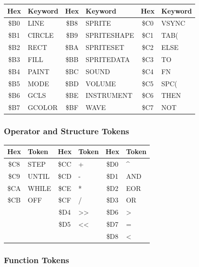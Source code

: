 \begin{center}
\begin{longtable}{cl|cl|cl}
\toprule
\textbf{Hex} & \textbf{Keyword} &
\textbf{Hex} & \textbf{Keyword} &
\textbf{Hex} & \textbf{Keyword} \\
\midrule
\endhead
\$B0 & LINE        & \$B8 & SPRITE      & \$C0 & VSYNC    \\
\$B1 & CIRCLE      & \$B9 & SPRITESHAPE & \$C1 & TAB(     \\
\$B2 & RECT        & \$BA & SPRITESET   & \$C2 & ELSE     \\
\$B3 & FILL        & \$BB & SPRITEDATA  & \$C3 & TO       \\
\$B4 & PAINT       & \$BC & SOUND       & \$C4 & FN       \\
\$B5 & MODE        & \$BD & VOLUME      & \$C5 & SPC(     \\
\$B6 & GCLS        & \$BE & INSTRUMENT  & \$C6 & THEN     \\
\$B7 & GCOLOR      & \$BF & WAVE        & \$C7 & NOT      \\
\bottomrule
\end{longtable}
\end{center}

\subsubsection*{Operator and Structure Tokens}

\begin{center}
\begin{tabular}{cl|cl|cl}
\toprule
\textbf{Hex} & \textbf{Token} &
\textbf{Hex} & \textbf{Token} &
\textbf{Hex} & \textbf{Token} \\
\midrule
\$C8 & STEP     & \$CC & +     & \$D0 & \^{}     \\
\$C9 & UNTIL    & \$CD & -     & \$D1 & AND      \\
\$CA & WHILE    & \$CE & *     & \$D2 & EOR      \\
\$CB & OFF      & \$CF & /     & \$D3 & OR       \\
     &          & \$D4 & >>    & \$D6 & >        \\
     &          & \$D5 & <<    & \$D7 & =        \\
     &          &      &       & \$D8 & <        \\
\bottomrule
\end{tabular}
\end{center}

\subsubsection*{Function Tokens}

